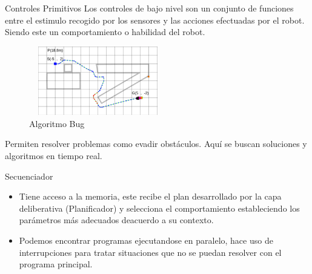\documentclass[
	11pt, %
]{beamer}
\begin{document}
\begin{frame}{Controles Primitivos}
  Los controles de bajo nivel son un conjunto de funciones entre el estimulo recogido por los sensores y las acciones efectuadas por el robot. Siendo este un comportamiento o habilidad del robot.\\
  \begin{figure}
    \centering
    \includegraphics[width=6cm, height=3cm]{bug_algo}
    \caption[Caption for LOF]{Algoritmo Bug\protect\footnotemark}
  \end{figure}
  Permiten resolver problemas como evadir obst\'{a}culos. Aqu\'{i} se buscan soluciones y algoritmos en tiempo real.
\end{frame}

\begin{frame}{Secuenciador}
  
  \begin{itemize}
    \item Tiene acceso a la memoria, este recibe el plan desarrollado por la capa deliberativa (Planificador) y selecciona el comportamiento estableciendo los par\'{a}metros m\'{a}s adecuados deacuerdo a su contexto.
    \item Podemos encontrar programas ejecutandose en paralelo, hace uso de interrupciones para tratar situaciones que no se puedan resolver con el programa principal.
  \end{itemize}
      
\end{frame}
\end{document}
